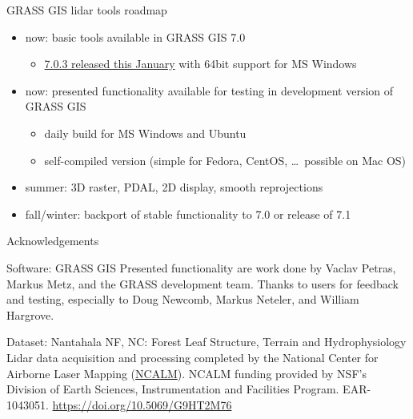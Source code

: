 \documentclass[xcolor={dvipsnames,usenames},beamer,aspectratio=169]{beamer}
\begin{document}
\begin{frame}{GRASS GIS lidar tools roadmap}

 \begin{itemize}
  \item now: basic tools available in GRASS GIS 7.0
    \begin{itemize}
      \item \href{https://grass.osgeo.org/news/54/15/GRASS-GIS-7-0-3-released/}{7.0.3 released this January}
        with 64bit support for MS Windows
    \end{itemize}
  \item now: presented functionality available for testing in development version of GRASS GIS
    \begin{itemize}
      \item daily build for MS Windows and Ubuntu
      \item self-compiled version (simple for Fedora, CentOS, \ldots\ possible on Mac OS)
    \end{itemize}
  \item summer: 3D raster, PDAL, 2D display, smooth reprojections
  \item fall/winter: backport of stable functionality to 7.0 or release of 7.1
 \end{itemize}

\end{frame}


\begin{frame}{Acknowledgements}

\vspace*{0.05\textheight}

\begin{block}{Software: GRASS GIS}
Presented functionality are work done by Vaclav Petras, Markus Metz, and the GRASS development team.
Thanks to users for feedback and testing, especially to Doug Newcomb, Markus Neteler, and William Hargrove.
\end{block}

\begin{block}{Dataset: Nantahala NF, NC: Forest Leaf Structure, Terrain and Hydrophysiology}
Lidar data acquisition and processing completed
by the National Center for Airborne Laser Mapping (\href{http://www.ncalm.org}{NCALM}).
NCALM funding provided by NSF's Division of Earth Sciences, Instrumentation and Facilities Program.
EAR-1043051. \url{https://doi.org/10.5069/G9HT2M76}
\end{block}

\end{frame}
\end{document}
